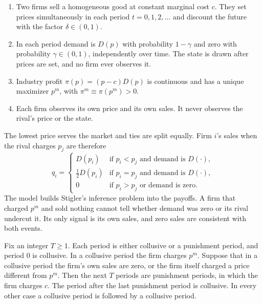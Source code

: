 \begin{assumption}\label{asm:12-gp-bertrand}
\leavevmode
\begin{enumerate}[label=(\roman*)]
\item Two firms sell a homogeneous good at constant marginal cost $c$. They set prices simultaneously in each period
$t = 0, 1, 2, \dots$ and discount the future with the factor $\delta \in (0,1)$.
\item In each period demand is $D(p)$ with probability $1 - \gamma$ and zero with probability $\gamma \in (0,1)$,
independently over time. The state is drawn after prices are set, and no firm ever observes it.
\item Industry profit $\pi(p) = (p - c)D(p)$ is continuous and has a unique maximizer $p^m$, with
$\pi^m \equiv \pi(p^m) > 0$.
\item Each firm observes its own price and its own sales. It never observes the rival's price or the state.
\end{enumerate}
\end{assumption}

The lowest price serves the market and ties are split equally. Firm $i$'s sales when the rival charges $p_j$ are
therefore
\begin{equation}\label{eq:12-gp-sales}
q_i =
\begin{cases}
D(p_i) & \text{if } p_i < p_j \text{ and demand is } D(\cdot),\\[2pt]
\frac{1}{2}D(p_i) & \text{if } p_i = p_j \text{ and demand is } D(\cdot),\\[2pt]
0 & \text{if } p_i > p_j \text{ or demand is zero.}
\end{cases}
\end{equation}
The model builds Stigler's inference problem into the payoffs. A firm that charged $p^m$ and sold nothing cannot tell
whether demand was zero or its rival undercut it. Its only signal is its own sales, and zero sales are consistent
with both events.

\begin{definition}\label{def:12-gp-trigger}
Fix an integer $T \ge 1$. Each period is either collusive or a punishment period, and period $0$ is collusive. In a
collusive period the firm charges $p^m$. Suppose that in a collusive period the firm's own sales are zero, or the
firm itself charged a price different from $p^m$. Then the next $T$ periods are punishment periods, in which the firm
charges $c$. The period after the last punishment period is collusive. In every other case a collusive period is followed by
a collusive period.
\end{definition}

